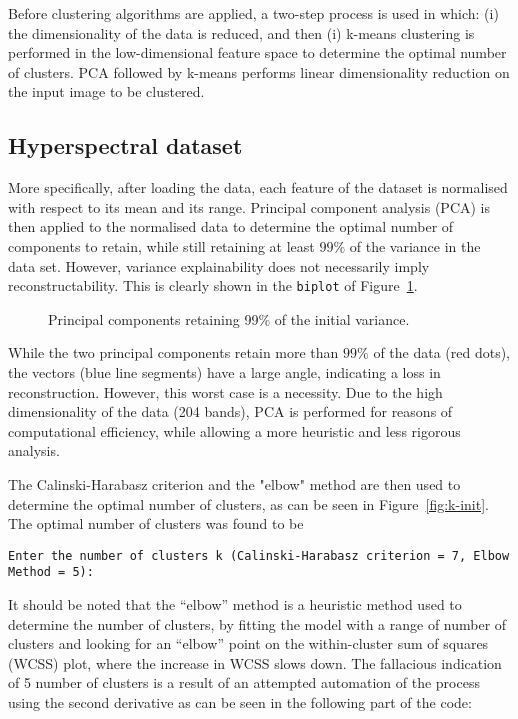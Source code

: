 \documentclass[
  course = {{DS12E Clustering Algorithms}},
  quartile = {{2}},
  assignment = ,
  name = {{Michael Darmanis ; Vasilios Venieris}},
  studentnumber = {{7115152200004 ; 7115152200017}},
  email = {{mdarm@di.uoa.gr ; vvenieris@di.uoa.gr}},
  firstexercise = 1
]{aga-homework}
\begin{document}
Before clustering algorithms are applied, a two-step process is used in which: (i) the dimensionality of the data is reduced, and then (i) k-means clustering is performed in the low-dimensional feature space to determine the optimal number of clusters. PCA followed by k-means performs linear dimensionality reduction on the input image to be clustered.

\subsection{Hyperspectral dataset}

More specifically, after loading the data, each feature of the dataset is normalised with respect to its mean and its range. Principal component analysis (PCA) is then applied to the normalised data to determine the optimal number of components to retain, while still retaining at least $99\%$ of the variance in the data set. However, variance explainability does not necessarily imply reconstructability. This is clearly shown in the \texttt{biplot} \cite{biplot} of Figure~\ref{fig:bplot}.

\begin{figure}[htbp!]
  \centering
  \def\svgwidth{.7\linewidth}
  
  \caption{Principal components retaining 99\% of the initial variance.}
  \label{fig:bplot}
\end{figure}

While the two principal components retain more than $99\%$ of the data (red dots), the vectors (blue line segments) have a large angle, indicating a loss in reconstruction. However, this worst case is a necessity. Due to the high dimensionality of the data (204 bands), PCA is performed for reasons of computational efficiency, while allowing a more heuristic and less rigorous analysis.

The Calinski-Harabasz criterion and the "elbow" method are then used to determine the optimal number of clusters, as can be seen in Figure~\ref{fig:k-init}. The optimal number of clusters was found to be

\begin{verbatim}
Enter the number of clusters k (Calinski-Harabasz criterion = 7, Elbow Method = 5):
\end{verbatim} 

It should be noted that the ``elbow'' method is a heuristic method used to determine the number of clusters, by fitting the model with a range of number of clusters and looking for an ``elbow'' point on the within-cluster sum of squares (WCSS) plot, where the increase in WCSS slows down. The fallacious indication of 5 number of clusters is a result of an attempted automation of the process using the second derivative as can be seen in the following part of the code:
\end{document}
